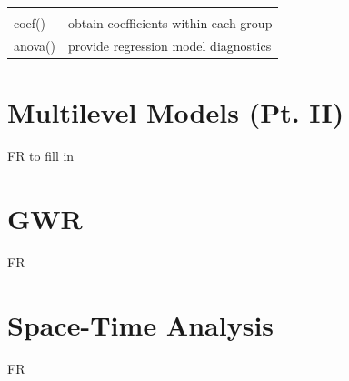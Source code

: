 \documentclass[]{book}
\begin{document}
\begin{longtable}[]{@{}ll@{}}
\begin{minipage}[t]{0.60\columnwidth}
\end{minipage}\tabularnewline
\begin{minipage}[t]{0.14\columnwidth}\raggedright\strut
coef()\strut
\end{minipage} & \begin{minipage}[t]{0.60\columnwidth}\raggedright\strut
obtain coefficients within each group\strut
\end{minipage}\tabularnewline
\begin{minipage}[t]{0.14\columnwidth}\raggedright\strut
anova()\strut
\end{minipage} & \begin{minipage}[t]{0.60\columnwidth}\raggedright\strut
provide regression model diagnostics\strut
\end{minipage}\tabularnewline
\bottomrule
\end{longtable}

\chapter{Multilevel Models (Pt. II)}\label{multilevel-models-pt.-ii}

FR to fill in

\chapter{GWR}\label{gwr}

FR

\chapter{Space-Time Analysis}\label{space-time-analysis}

FR


\end{document}
